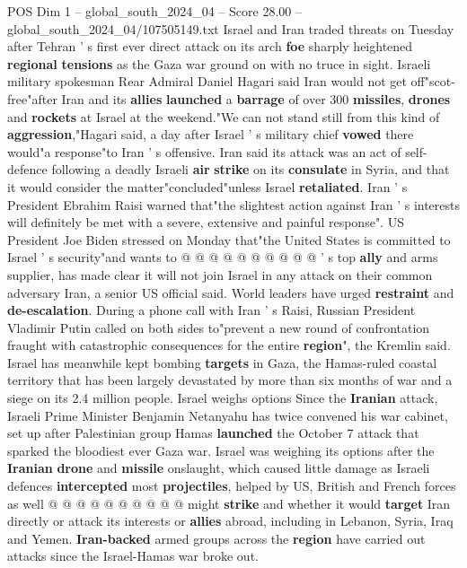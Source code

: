 \begin{textsample}{POS Dim 1 – global\_south\_2024\_04 – Score 28.00 – global\_south\_2024\_04/107505149.txt}  \label{ex:f1_pos_046}
Israel and Iran traded threats on Tuesday after Tehran ' s first ever direct attack on its arch \textbf{foe} sharply heightened \textbf{regional} \textbf{tensions} as the Gaza war ground on with no truce in sight.
Israeli military spokesman Rear Admiral Daniel Hagari said Iran would not get off"scot-free"after Iran and its \textbf{allies} \textbf{launched} a \textbf{barrage} of over 300 \textbf{missiles}, \textbf{drones} and \textbf{rockets} at Israel at the weekend."We can not stand still from this kind of \textbf{aggression},"Hagari said, a day after Israel ' s military chief \textbf{vowed} there would"a response"to Iran ' s offensive.
Iran said its attack was an act of self-defence following a deadly Israeli \textbf{air} \textbf{strike} on its \textbf{consulate} in Syria, and that it would consider the matter"concluded"unless Israel \textbf{retaliated}.
Iran ' s President Ebrahim Raisi warned that"the slightest action against Iran ' s interests will definitely be met with a severe, extensive and painful response".
US President Joe Biden stressed on Monday that"the United States is committed to Israel ' s security"and wants to @ @ @ @ @ @ @ @ @ @ ' s top \textbf{ally} and arms supplier, has made clear it will not join Israel in any attack on their common adversary Iran, a senior US official said.
World leaders have urged \textbf{restraint} and \textbf{de-escalation}.
During a phone call with Iran ' s Raisi, Russian President Vladimir Putin called on both sides to"prevent a new round of confrontation fraught with catastrophic consequences for the entire \textbf{region}", the Kremlin said.
Israel has meanwhile kept bombing \textbf{targets} in Gaza, the Hamas-ruled coastal territory that has been largely devastated by more than six months of war and a siege on its 2.4 million people.
Israel weighs options Since the \textbf{Iranian} attack, Israeli Prime Minister Benjamin Netanyahu has twice convened his war cabinet, set up after Palestinian group Hamas \textbf{launched} the October 7 attack that sparked the bloodiest ever Gaza war.
Israel was weighing its options after the \textbf{Iranian} \textbf{drone} and \textbf{missile} onslaught, which caused little damage as Israeli defences \textbf{intercepted} most \textbf{projectiles}, helped by US, British and French forces as well @ @ @ @ @ @ @ @ @ @ might \textbf{strike} and whether it would \textbf{target} Iran directly or attack its interests or \textbf{allies} abroad, including in Lebanon, Syria, Iraq and Yemen. \textbf{Iran-backed} armed groups across the \textbf{region} have carried out attacks since the Israel-Hamas war broke out.

\end{textsample}
